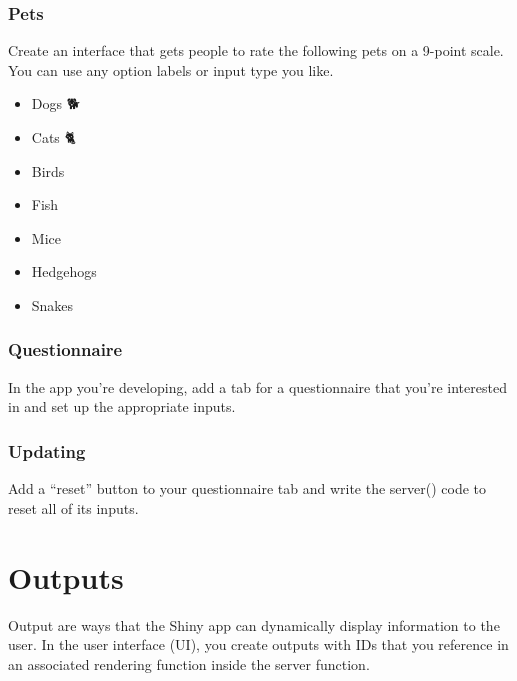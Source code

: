 \documentclass[
]{book}
\providecommand{\tightlist}{%
  \setlength{\itemsep}{0pt}\setlength{\parskip}{0pt}}
\begin{document}
\hypertarget{pets}{%
\subsection{Pets}\label{pets}}

Create an interface that gets people to rate the following pets on a 9-point scale. You can use any option labels or input type you like.

\begin{itemize}
\tightlist
\item
  Dogs 🐕\\
\item
  Cats 🐈\\
\item
  Birds 🦜\\
\item
  Fish 🐠\\
\item
  Mice 🐁\\
\item
  Hedgehogs 🦔\\
\item
  Snakes 🐍
\end{itemize}

\hypertarget{questionnaire}{%
\subsection{Questionnaire}\label{questionnaire}}

In the app you're developing, add a tab for a questionnaire that you're interested in and set up the appropriate inputs.

\hypertarget{updating}{%
\subsection{Updating}\label{updating}}

Add a ``reset'' button to your questionnaire tab and write the server() code to reset all of its inputs.

\hypertarget{outputs}{%
\chapter{Outputs}\label{outputs}}

Output are ways that the Shiny app can dynamically display information to the user. In the user interface (UI), you create outputs with IDs that you reference in an associated rendering function inside the server function.
\end{document}
